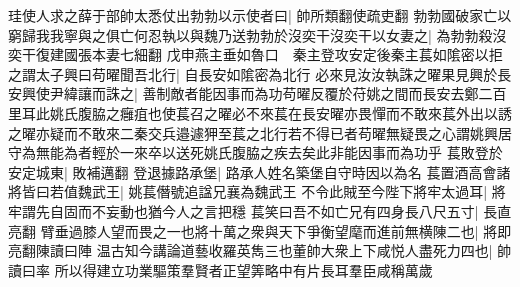 珪使人求之薛于部帥太悉仗出勃勃以示使者曰|{
	帥所類翻使疏吏翻}
勃勃國破家亡以窮歸我我寧與之俱亡何忍執以與魏乃送勃勃於沒奕干沒奕干以女妻之|{
	為勃勃殺沒奕干復建國張本妻七細翻}
戊申燕主垂如魯口　秦主登攻安定後秦主萇如隂密以拒之謂太子興曰苟曜聞吾北行|{
	自長安如隂密為北行}
必來見汝汝執誅之曜果見興於長安興使尹緯讓而誅之|{
	善制敵者能因事而為功苟曜反覆於苻姚之間而長安去鄭二百里耳此姚氏腹脇之癰疽也使萇召之曜必不來萇在長安曜亦畏憚而不敢來萇外出以誘之曜亦疑而不敢來二秦交兵邉遽狎至萇之北行若不得已者苟曜無疑畏之心謂姚興居守為無能為者輕於一來卒以送死姚氏腹脇之疾去矣此非能因事而為功乎}
萇敗登於安定城東|{
	敗補邁翻}
登退據路承堡|{
	路承人姓名築堡自守時因以為名}
萇置酒高會諸將皆曰若值魏武王|{
	姚萇僭號追諡兄襄為魏武王}
不令此賊至今陛下將牢太過耳|{
	將牢謂先自固而不妄動也猶今人之言把穩}
萇笑曰吾不如亡兄有四身長八尺五寸|{
	長直亮翻}
臂垂過膝人望而畏之一也將十萬之衆與天下爭衡望麾而進前無横陳二也|{
	將即亮翻陳讀曰陣}
温古知今講論道藝收羅英雋三也董帥大衆上下咸悦人盡死力四也|{
	帥讀曰率}
所以得建立功業驅策羣賢者正望筭略中有片長耳羣臣咸稱萬歲

